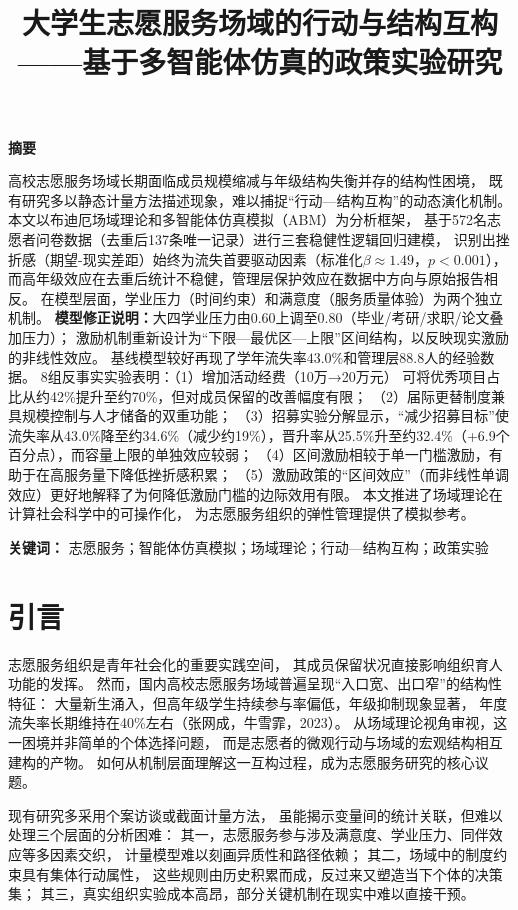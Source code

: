\documentclass[12pt,a4paper]{article}
\title{大学生志愿服务场域的行动与结构互构——基于多智能体仿真的政策实验研究}
\date{}
\author{}
\begin{document}
\maketitle

\begin{center}\textbf{摘要}\end{center}

高校志愿服务场域长期面临成员规模缩减与年级结构失衡并存的结构性困境，
既有研究多以静态计量方法描述现象，难以捕捉“行动—结构互构”的动态演化机制。
本文以布迪厄场域理论和多智能体仿真模拟（ABM）为分析框架，
基于572名志愿者问卷数据（去重后137条唯一记录）进行三套稳健性逻辑回归建模，
识别出挫折感（期望-现实差距）始终为流失首要驱动因素（标准化$\beta\approx1.49$，$p<0.001$），
而高年级效应在去重后统计不稳健，管理层保护效应在数据中方向与原始报告相反。
在模型层面，学业压力（时间约束）和满意度（服务质量体验）为两个独立机制。
\textbf{模型修正说明：}大四学业压力由0.60上调至0.80（毕业/考研/求职/论文叠加压力）；
激励机制重新设计为“下限—最优区—上限”区间结构，以反映现实激励的非线性效应。
基线模型较好再现了学年流失率$43.0\%$和管理层88.8人的经验数据。
8组反事实实验表明：（1）增加活动经费（10万→20万元）
可将优秀项目占比从约42\%提升至约70\%，但对成员保留的改善幅度有限；
（2）届际更替制度兼具规模控制与人才储备的双重功能；
（3）招募实验分解显示，“减少招募目标”使流失率从43.0\%降至约34.6\%（减少约19\%），晋升率从25.5\%升至约32.4\%（+6.9个百分点），而容量上限的单独效应较弱；
（4）区间激励相较于单一门槛激励，有助于在高服务量下降低挫折感积累；
（5）激励政策的“区间效应”（而非线性单调效应）更好地解释了为何降低激励门槛的边际效用有限。
本文推进了场域理论在计算社会科学中的可操作化，
为志愿服务组织的弹性管理提供了模拟参考。

\textbf{关键词：} 志愿服务；智能体仿真模拟；场域理论；行动—结构互构；政策实验

\newpage
\section{引言}

志愿服务组织是青年社会化的重要实践空间，
其成员保留状况直接影响组织育人功能的发挥。
然而，国内高校志愿服务场域普遍呈现“入口宽、出口窄”的结构性特征：
大量新生涌入，但高年级学生持续参与率偏低，年级抑制现象显著，
年度流失率长期维持在40\%左右（张网成，牛雪霏，2023）。
从场域理论视角审视，这一困境并非简单的个体选择问题，
而是志愿者的微观行动与场域的宏观结构相互建构的产物。
如何从机制层面理解这一互构过程，成为志愿服务研究的核心议题。

现有研究多采用个案访谈或截面计量方法，
虽能揭示变量间的统计关联，但难以处理三个层面的分析困难：
其一，志愿服务参与涉及满意度、学业压力、同伴效应等多因素交织，
计量模型难以刻画异质性和路径依赖；
其二，场域中的制度约束具有集体行动属性，
这些规则由历史积累而成，反过来又塑造当下个体的决策集；
其三，真实组织实验成本高昂，部分关键机制在现实中难以直接干预。
\end{document}
